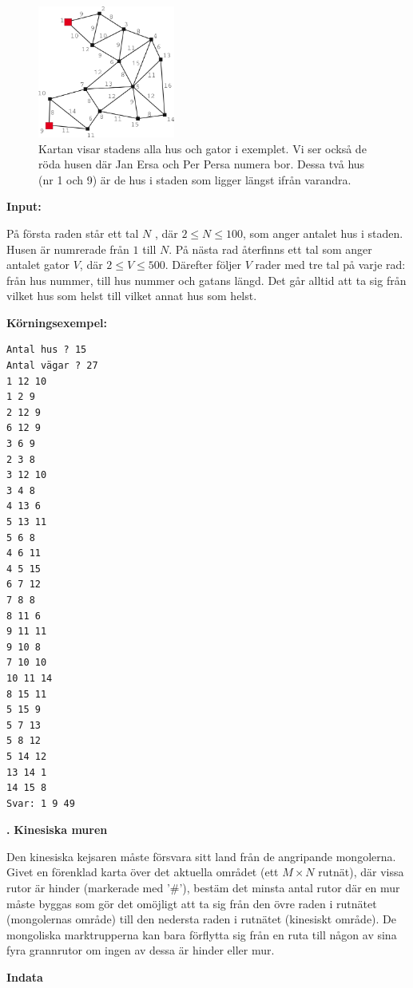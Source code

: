 \documentclass[a4paper,12pt]{article}
\newcounter{iii}\setcounter{iii}{0}
\def\i{\bigskip\noindent\refstepcounter{iii}\textbf{\arabic{iii}.} }
\begin{document}
\begin{figure}[H]
\centering
\includegraphics[width=0.4\textwidth]{janErsa}
\caption{Kartan visar stadens alla hus och gator i exemplet. Vi ser också de röda husen där Jan Ersa och Per Persa numera bor. Dessa två hus (nr 1 och 9) är de hus i staden som ligger längst ifrån varandra. }
\label{fig:soldater}
\end{figure}


\textbf{Input:}

På första raden står ett tal $N$
, där $2≤N≤100$, som anger antalet hus i staden. Husen är numrerade från $1$ till $N$. På nästa rad återfinns ett tal som anger antalet gator $V$, där $2≤V≤500$. Därefter följer $V$ rader med tre tal på varje rad: från hus nummer, till hus nummer och gatans längd. Det  går alltid att ta sig från vilket hus som helst till vilket annat hus som helst.

\textbf{Körningsexempel:}
\begin{lstlisting}
Antal hus ? 15
Antal vägar ? 27
1 12 10
1 2 9
2 12 9
6 12 9
3 6 9
2 3 8
3 12 10
3 4 8
4 13 6
5 13 11
5 6 8
4 6 11
4 5 15
6 7 12
7 8 8
8 11 6
9 11 11
9 10 8
7 10 10
10 11 14
8 15 11
5 15 9
5 7 13
5 8 12
5 14 12
13 14 1
14 15 8
Svar: 1 9 49
\end{lstlisting}





\i \textbf{Kinesiska muren}

Den kinesiska kejsaren måste försvara sitt land från de angripande mongolerna. Givet en förenklad karta över det aktuella området (ett $M × N$ rutnät), där vissa rutor är hinder (markerade med ’\#’), bestäm det minsta antal rutor där en mur måste byggas som gör det omöjligt att ta sig från den övre raden i rutnätet (mongolernas område) till den nedersta raden i rutnätet (kinesiskt område). De mongoliska marktrupperna kan bara förflytta sig från en ruta till någon av sina fyra grannrutor om ingen av dessa är hinder eller mur. 

 \textbf{Indata}
\end{document}
